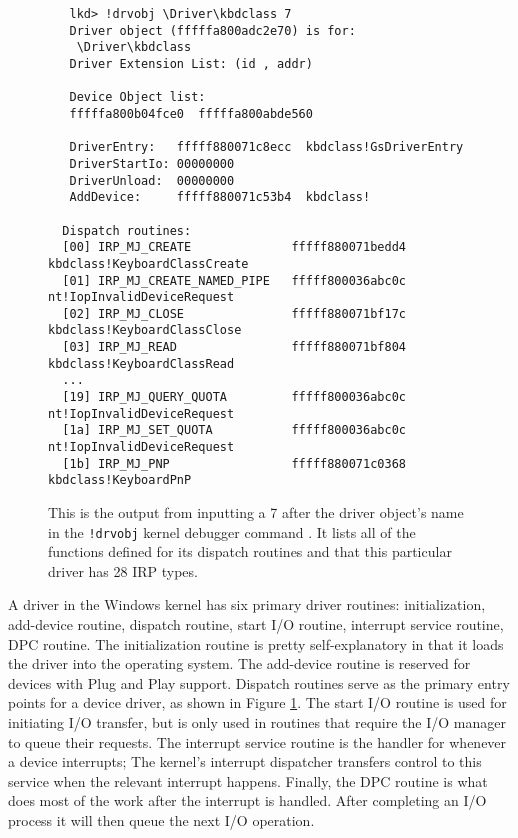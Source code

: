 \begin{figure}[h]
\begin{lstlisting}
   lkd> !drvobj \Driver\kbdclass 7
   Driver object (fffffa800adc2e70) is for:
    \Driver\kbdclass
   Driver Extension List: (id , addr)

   Device Object list:
   fffffa800b04fce0  fffffa800abde560

   DriverEntry:   fffff880071c8ecc  kbdclass!GsDriverEntry
   DriverStartIo: 00000000
   DriverUnload:  00000000
   AddDevice:     fffff880071c53b4  kbdclass!

  Dispatch routines:
  [00] IRP_MJ_CREATE              fffff880071bedd4  kbdclass!KeyboardClassCreate
  [01] IRP_MJ_CREATE_NAMED_PIPE   fffff800036abc0c  nt!IopInvalidDeviceRequest
  [02] IRP_MJ_CLOSE               fffff880071bf17c  kbdclass!KeyboardClassClose
  [03] IRP_MJ_READ                fffff880071bf804  kbdclass!KeyboardClassRead
  ...
  [19] IRP_MJ_QUERY_QUOTA         fffff800036abc0c  nt!IopInvalidDeviceRequest
  [1a] IRP_MJ_SET_QUOTA           fffff800036abc0c  nt!IopInvalidDeviceRequest
  [1b] IRP_MJ_PNP                 fffff880071c0368  kbdclass!KeyboardPnP
\end{lstlisting}
\centering
\captionsetup{justification=centering}
\caption{
  This is the output from inputting a 7 after the driver object's name in the \texttt{!drvobj} kernel debugger command \cite{win:2}.
  It lists all of the functions defined for its dispatch routines and that this particular driver has 28 IRP types.
}
\label{code:dispatch_routine}
\end{figure}

\par A driver in the Windows kernel has six primary driver routines: initialization, add-device routine, dispatch routine, start I/O routine, interrupt service routine, DPC routine.
The initialization routine is pretty self-explanatory in that it loads the driver into the operating system.
The add-device routine is reserved for devices with Plug and Play support.
Dispatch routines serve as the primary entry points for a device driver, as shown in Figure \ref{code:dispatch_routine}.
The start I/O routine is used for initiating I/O transfer, but is only used in routines that require the I/O manager to queue their requests.
The interrupt service routine is the handler for whenever a device interrupts; The kernel's interrupt dispatcher transfers control to this service when the relevant interrupt happens.
Finally, the DPC routine is what does most of the work after the interrupt is handled.
After completing an I/O process it will then queue the next I/O operation.

